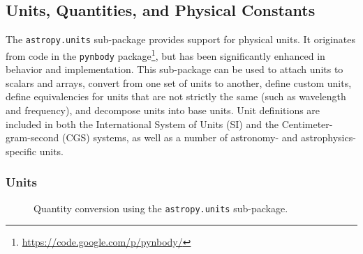 \documentclass[traditabstract]{aa}
\begin{document}
\label{sec:capabilities}

\subsection{Units, Quantities, and Physical Constants}

\label{sec:units_main}


The \texttt{astropy.units} sub-package provides support for physical units. It
originates from code in the \texttt{pynbody}
package\footnote{\url{https://code.google.com/p/pynbody/}}, but has been
significantly enhanced in behavior and implementation. This sub-package can be
used to attach units to scalars and arrays, convert from one set of units to
another, define custom units, define equivalencies for units that are not
strictly the same (such as wavelength and frequency), and decompose units into
base units. Unit definitions are included in both the International System of
Units (SI) and the Centimeter-gram-second (CGS) systems, as well as a number
of astronomy- and astrophysics-specific units.

\subsubsection{Units}

\begin{figure}
\center
\caption{Quantity conversion using the \texttt{astropy.units} sub-package.\label{code:quantities}}
\vspace{0.1in}
\end{figure}
\label{sec:units}
\end{document}
